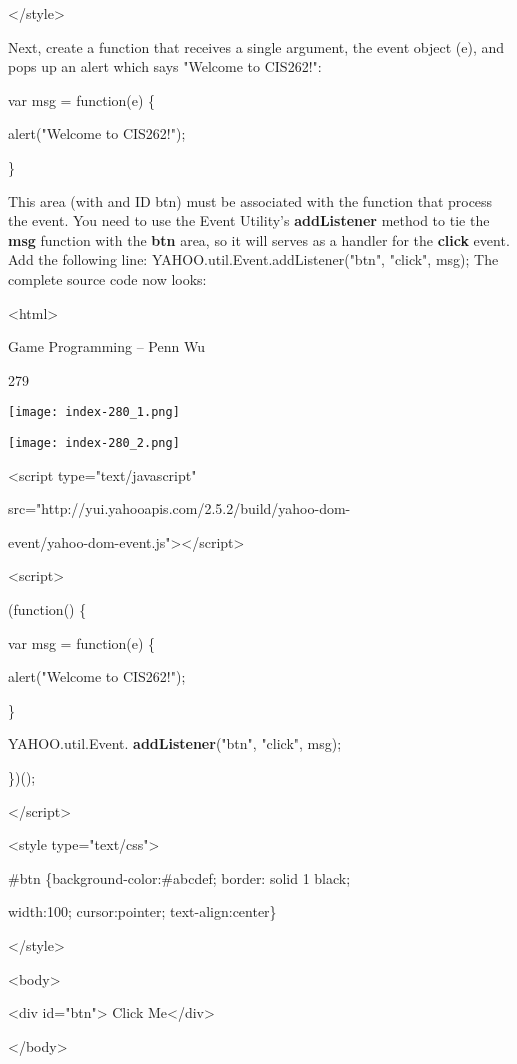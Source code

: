 \documentclass[
]{article}
\begin{document}
\textless/style\textgreater{}

Next, create a function that receives a single argument, the event
object (e), and pops up an alert which says "Welcome to CIS262!":

var msg = function(e) \{

alert("Welcome to CIS262!");

\}

This area (with and ID btn) must be associated with the function that
process the event. You need to use the Event Utility's
\textbf{addListener} method to tie the \textbf{msg} function with the
\textbf{btn} area, so it will serves as a handler for the \textbf{click}
event. Add the following line: YAHOO.util.Event.addListener("btn",
"click", msg); The complete source code now looks:

\textless html\textgreater{}

Game Programming -- Penn Wu

279

\protect\hypertarget{index_split_015.htmlux5cux23p280}{}{}\texttt{[image: index-280\_1.png]}

\texttt{[image: index-280\_2.png]}

\textless script type="text/javascript"

src="http://yui.yahooapis.com/2.5.2/build/yahoo-dom-

event/yahoo-dom-event.js"\textgreater\textless/script\textgreater{}

\textless script\textgreater{}

(function() \{

var msg = function(e) \{

alert("Welcome to CIS262!");

\}

YAHOO.util.Event. \textbf{addListener}("btn", "click", msg);

\})();

\textless/script\textgreater{}

\textless style type="text/css"\textgreater{}

\#btn \{background-color:\#abcdef; border: solid 1 black;

width:100; cursor:pointer; text-align:center\}

\textless/style\textgreater{}

\textless body\textgreater{}

\textless div id="btn"\textgreater{} Click Me\textless/div\textgreater{}

\textless/body\textgreater{}
\end{document}
